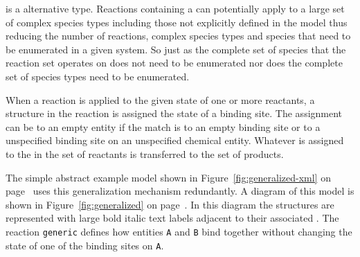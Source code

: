 \documentclass{cekarticle}
\begin{document}
 is a alternative  type.  Reactions
containing a  can potentially apply to a large
set of complex species types including those not explicitly
defined in the model thus reducing the number of reactions,
complex species types and species that need to be enumerated in a
given system.  So just as the complete set of species that the
reaction set operates on does not need to be enumerated nor does
the complete set of species types need to be enumerated.

When a reaction is applied to the given state of one or more
reactants, a  structure in the reaction is
assigned the state of a binding site.  The assignment can be to an
empty entity if the match is to an empty binding site or to a
unspecified binding site on an unspecified chemical entity.
Whatever is assigned to the  in the set of
reactants is transferred to the set of products.

The simple abstract example model shown in
Figure~\ref{fig:generalized-xml} on
page~\pageref{fig:generalized-xml} uses this generalization
mechanism redundantly. A diagram of this model is shown in
Figure~\ref{fig:generalized} on page~\pageref{fig:generalized}. In
this diagram the  structures are represented
with large bold italic text labels adjacent to their associated
. The reaction \texttt{generic} defines how
entities \texttt{A} and \texttt{B} bind together without changing
the state of one of the binding sites on \texttt{A}.
\end{document}
